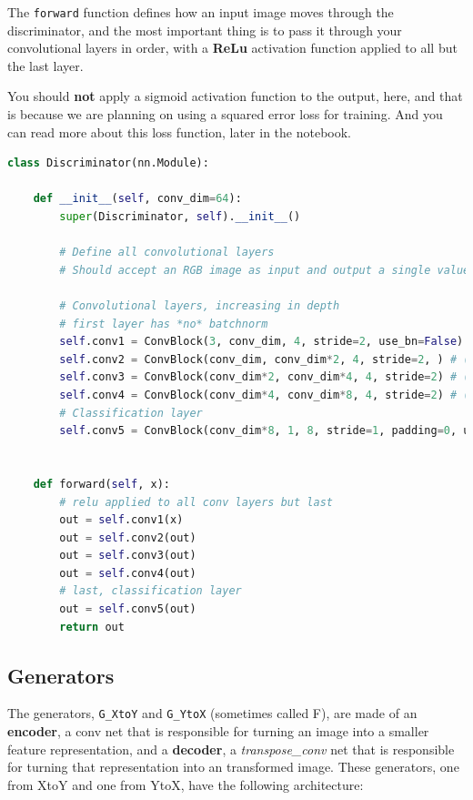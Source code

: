 The \lstinline{forward} function defines how an input
image moves through the discriminator, and the most important thing is
to pass it through your convolutional layers in order, with a
\textbf{ReLu} activation function applied to all but the last layer.\newline

You should \textbf{not} apply a sigmoid activation function to the
output, here, and that is because we are planning on using a squared
error loss for training. And you can read more about this loss function,
later in the notebook.

\begin{lstlisting}[language=Python]
class Discriminator(nn.Module):
    
    def __init__(self, conv_dim=64):
        super(Discriminator, self).__init__()

        # Define all convolutional layers
        # Should accept an RGB image as input and output a single value

        # Convolutional layers, increasing in depth
        # first layer has *no* batchnorm
        self.conv1 = ConvBlock(3, conv_dim, 4, stride=2, use_bn=False) # x, y = 64, depth 64
        self.conv2 = ConvBlock(conv_dim, conv_dim*2, 4, stride=2, ) # (32, 32, 128)
        self.conv3 = ConvBlock(conv_dim*2, conv_dim*4, 4, stride=2) # (16, 16, 256)
        self.conv4 = ConvBlock(conv_dim*4, conv_dim*8, 4, stride=2) # (8, 8, 512)
        # Classification layer
        self.conv5 = ConvBlock(conv_dim*8, 1, 8, stride=1, padding=0, use_bn=False, use_activation=False)
        

    def forward(self, x):
        # relu applied to all conv layers but last
        out = self.conv1(x)
        out = self.conv2(out)
        out = self.conv3(out)
        out = self.conv4(out)
        # last, classification layer
        out = self.conv5(out)
        return out
\end{lstlisting}

\subsection{Generators}

The generators, \lstinline{G_XtoY} and
\lstinline{G_YtoX} (sometimes called F), are made of an
\textbf{encoder}, a conv net that is responsible for turning an image
into a smaller feature representation, and a \textbf{decoder}, a
\emph{transpose\_conv} net that is responsible for turning that
representation into an transformed image. These generators, one from
XtoY and one from YtoX, have the following architecture:

